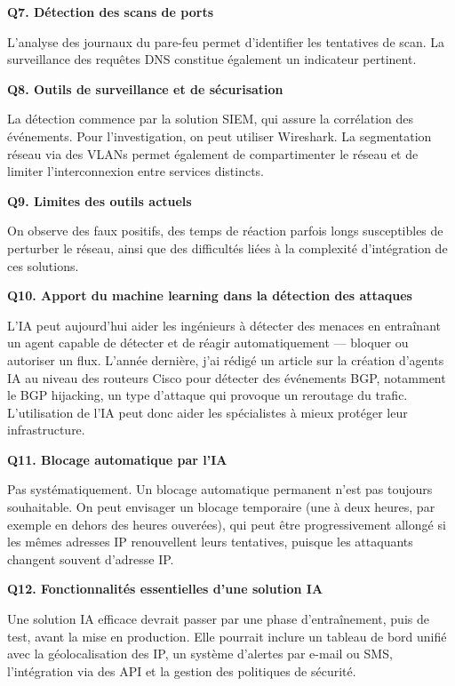 \documentclass[12pt,a4paper]{article}
\begin{document}
\bigskip
\textbf{Q7. D\'{e}tection des scans de ports}

L'analyse des journaux du pare-feu permet d'identifier les tentatives de scan. La surveillance
des requ\^{e}tes DNS constitue \'{e}galement un indicateur pertinent.

\bigskip
\textbf{Q8. Outils de surveillance et de s\'{e}curisation}

La d\'{e}tection commence par la solution SIEM, qui assure la corr\'{e}lation des \'{e}v\'{e}nements. Pour
l'investigation, on peut utiliser Wireshark. La segmentation r\'{e}seau via des VLANs permet
\'{e}galement de compartimenter le r\'{e}seau et de limiter l'interconnexion entre services distincts.

\bigskip
\textbf{Q9. Limites des outils actuels}

On observe des faux positifs, des temps de r\'{e}action parfois longs susceptibles de perturber
le r\'{e}seau, ainsi que des difficult\'{e}s li\'{e}es \`{a} la complexit\'{e} d'int\'{e}gration de ces solutions.

\bigskip
\textbf{Q10. Apport du machine learning dans la d\'{e}tection des attaques}

L'IA peut aujourd'hui aider les ing\'{e}nieurs \`{a} d\'{e}tecter des menaces en entra\^{i}nant un agent
capable de d\'{e}tecter et de r\'{e}agir automatiquement --- bloquer ou autoriser un flux. L'ann\'{e}e
derni\`{e}re, j'ai r\'{e}dig\'{e} un article sur la cr\'{e}ation d'agents IA au niveau des routeurs Cisco pour
d\'{e}tecter des \'{e}v\'{e}nements BGP, notamment le BGP hijacking, un type d'attaque qui provoque
un reroutage du trafic. L'utilisation de l'IA peut donc aider les sp\'{e}cialistes \`{a} mieux prot\'{e}ger
leur infrastructure.

\bigskip
\textbf{Q11. Blocage automatique par l'IA}

Pas syst\'{e}matiquement. Un blocage automatique permanent n'est pas toujours souhaitable.
On peut envisager un blocage temporaire (une \`{a} deux heures, par exemple en dehors des
heures ouver\'{e}es), qui peut \^{e}tre progressivement allong\'{e} si les m\^{e}mes adresses IP
renouvellent leurs tentatives, puisque les attaquants changent souvent d'adresse IP.

\bigskip
\textbf{Q12. Fonctionnalit\'{e}s essentielles d'une solution IA}

Une solution IA efficace devrait passer par une phase d'entra\^{i}nement, puis de test, avant la
mise en production. Elle pourrait inclure un tableau de bord unifi\'{e} avec la g\'{e}olocalisation des
IP, un syst\`{e}me d'alertes par e-mail ou SMS, l'int\'{e}gration via des API et la gestion des
politiques de s\'{e}curit\'{e}.
\end{document}
